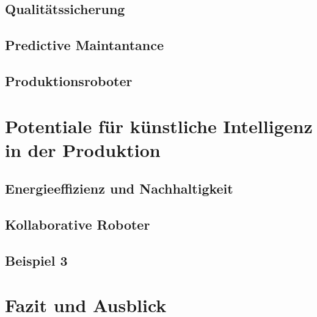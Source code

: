 \documentclass[a4paper,12pt, german]{report}
\begin{document}

\section{Qualitätssicherung}

\section{Predictive Maintantance}


\section{Produktionsroboter}



\chapter{Potentiale für künstliche Intelligenz in der Produktion}









\section{Energieeffizienz und Nachhaltigkeit}

\section{Kollaborative Roboter}

\section{Beispiel 3}


\chapter{Fazit und Ausblick}

\listoffigures

\clearpage




\appendix
\end{document}
